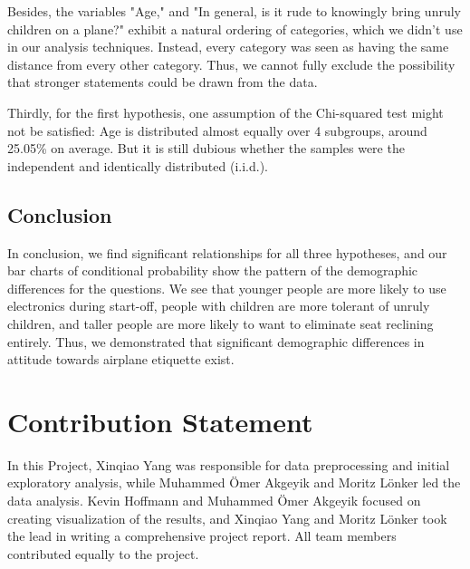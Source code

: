 \documentclass{article}
\theoremstyle{plain}
\theoremstyle{definition}
\theoremstyle{remark}
\begin{document}
Besides, the variables "Age," and "In general, is it rude to knowingly bring unruly children on a plane?" exhibit a natural ordering of categories, which we didn't use in our analysis techniques. Instead, every category was seen as having the same distance from every other category. Thus, we cannot fully exclude the possibility that stronger statements could be drawn from the data.


Thirdly, for the first hypothesis, one assumption of the Chi-squared test might not be satisfied: Age is distributed almost equally over 4 subgroups, around 25.05\% on average. But it is still dubious whether the samples were the independent and identically distributed (i.i.d.).


\subsection{Conclusion}
In conclusion, we find significant relationships for all three hypotheses, and our bar charts of conditional probability show the pattern of the demographic differences for the questions. We see that younger people are more likely to use electronics during start-off, people with children are more tolerant of unruly children, and taller people are more likely to want to eliminate seat reclining entirely. Thus, we demonstrated that significant demographic differences in attitude towards airplane etiquette exist.

\section*{Contribution Statement}

In this Project, Xinqiao Yang was responsible for data preprocessing and initial exploratory analysis, while Muhammed \"Omer Akgeyik and Moritz L\"onker led the data analysis. Kevin Hoffmann and Muhammed \"Omer Akgeyik focused on creating visualization of the results, and Xinqiao Yang and Moritz L\"onker took the lead in writing a comprehensive project report. All team members contributed equally to the project.


\end{document}

